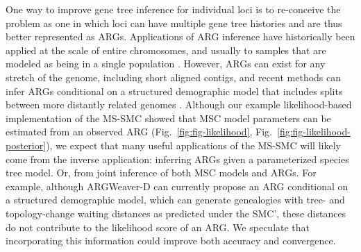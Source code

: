 \documentclass[11pt]{article}
\begin{document}
One way to improve gene tree inference for individual loci is to 
re-conceive the problem as one in which loci can have multiple
gene tree histories and are thus better represented as ARGs.
Applications of ARG inference have historically been applied at the
scale of entire chromosomes, and usually to samples that are modeled
as being in a single population 
\citep{rasmussen2014genome, kelleher2019inferring, speidel2019method}.
However, ARGs can exist for any stretch of the genome, 
including short aligned contigs, and recent methods can 
infer ARGs conditional on a structured demographic model that 
includes splits between more distantly related genomes 
\citep{hubisz2020inference}.
Although our example likelihood-based implementation of the MS-SMC 
showed that MSC model parameters can be estimated from an observed ARG 
(Fig.~\ref{fig:fig-likelihood}, Fig.~\ref{fig:fig-likelihood-posterior}), 
we expect that many useful applications of the MS-SMC will likely come 
from the inverse application: inferring ARGs given a parameterized species
tree model. Or, from joint inference of both MSC models and ARGs. 
For example, although ARGWeaver-D \citep{hubisz2020inference} 
can currently propose an ARG conditional 
on a structured demographic model, which can generate genealogies with
tree- and topology-change waiting distances as predicted under the SMC', 
these distances do not contribute to the likelihood score of an ARG. 
We speculate that incorporating this information could improve both accuracy
and convergence.

\end{document}
